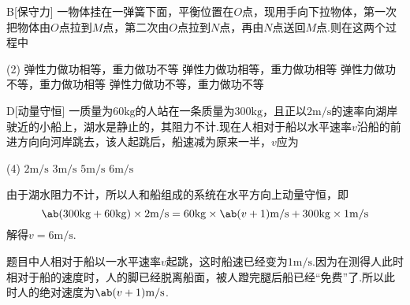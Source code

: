 \begin{paracol}{2}
    \begin{choice}{B}[保守力]
        一物体挂在一弹簧下面，平衡位置在$O$点，现用手向下拉物体，第一次把物体由$O$点拉到$M$点，第二次由$O$点拉到$N$点，再由$N$点送回$M$点.则在这两个过程中
        \begin{tasks}(2)
            \task 弹性力做功相等，重力做功不等
            \task 弹性力做功相等，重力做功相等
            \task 弹性力做功不等，重力做功相等
            \task 弹性力做功不等，重力做功不等
        \end{tasks}
    \end{choice}
    \switchcolumn
    \centering\vfill
    \vfill
\end{paracol}

\begin{choice}{D}[动量守恒]
    一质量为$60\mathrm{kg}$的人站在一条质量为$300\mathrm{kg}$，且正以$2\mathrm{m/s}$的速率向湖岸驶近的小船上，湖水是静止的，其阻力不计.现在人相对于船以水平速率$v$沿船的前进方向向河岸跳去，该人起跳后，船速减为原来一半，$v$应为
    \begin{tasks}(4)
        \task $2\mathrm{m/s}$
        \task $3\mathrm{m/s}$
        \task $5\mathrm{m/s}$
        \task $6\mathrm{m/s}$
    \end{tasks}
\end{choice}
\begin{solution}
    由于湖水阻力不计，所以人和船组成的系统在水平方向上动量守恒，即
    $$\ab(300\mathrm{kg}+60\mathrm{kg})\times 2\mathrm{m/s}=60\mathrm{kg}\times\ab(v+1)\mathrm{m/s}+300\mathrm{kg}\times 1\mathrm{m/s}$$
    解得$v=6\mathrm{m/s}$.
\end{solution}
\begin{note}
    题目中人相对于船以一水平速率$v$起跳，这时船速已经变为$1\mathrm{m/s}$.因为在测得人此时相对于船的速度时，人的脚已经脱离船面，被人蹬完腿后船已经“免费”了.所以此时人的绝对速度为$\ab(v+1)\mathrm{m/s}$.
\end{note}

